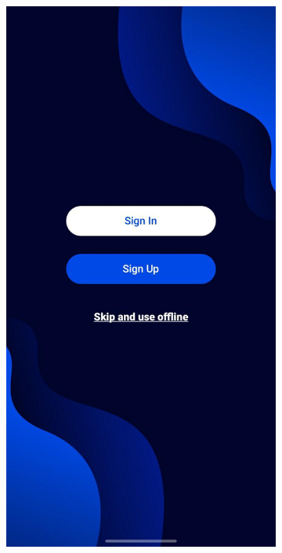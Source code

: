 \begin{figure}[H]
  \centering
  \begin{subfigure}{0.2\textwidth}
    \includegraphics[width=\linewidth]{images/3-aplicatia-android/welcome_screen_android_app.png}
    \caption{}

\end{subfigure}
\end{figure}
